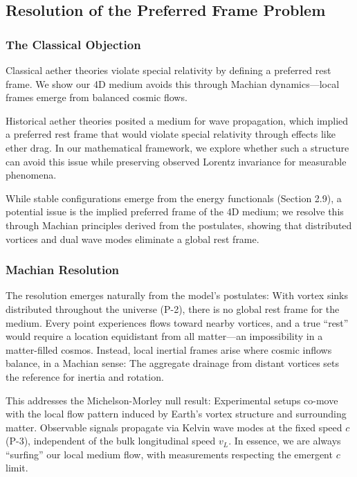 \subsection{Resolution of the Preferred Frame Problem}

\subsubsection{The Classical Objection}

Classical aether theories violate special relativity by defining a preferred rest frame. We show our 4D medium avoids this through Machian dynamics---local frames emerge from balanced cosmic flows.

Historical aether theories posited a medium for wave propagation, which implied a preferred rest frame that would violate special relativity through effects like ether drag. In our mathematical framework, we explore whether such a structure can avoid this issue while preserving observed Lorentz invariance for measurable phenomena.

While stable configurations emerge from the energy functionals (Section 2.9), a potential issue is the implied preferred frame of the 4D medium; we resolve this through Machian principles derived from the postulates, showing that distributed vortices and dual wave modes eliminate a global rest frame.

\subsubsection{Machian Resolution}

The resolution emerges naturally from the model's postulates: With vortex sinks distributed throughout the universe (P-2), there is no global rest frame for the medium. Every point experiences flows toward nearby vortices, and a true ``rest'' would require a location equidistant from all matter---an impossibility in a matter-filled cosmos. Instead, local inertial frames arise where cosmic inflows balance, in a Machian sense: The aggregate drainage from distant vortices sets the reference for inertia and rotation.

This addresses the Michelson-Morley null result: Experimental setups co-move with the local flow pattern induced by Earth's vortex structure and surrounding matter. Observable signals propagate via Kelvin wave modes at the fixed speed $c$ (P-3), independent of the bulk longitudinal speed $v_L$. In essence, we are always ``surfing'' our local medium flow, with measurements respecting the emergent $c$ limit.

